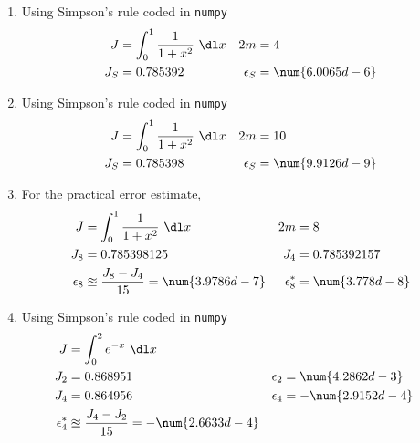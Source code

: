 \begin{enumerate}
    \item Using Simpson's rule coded in \texttt{numpy}
          \begin{align}
              J          & = \int_{0}^{1} \frac{1}{1 + x^2}\ \dl x &
              2m         & = 4                                       \\
              J_S        & = 0.785392                              &
              \epsilon_S & = \num{6.0065d-6}
          \end{align}

    \item Using Simpson's rule coded in \texttt{numpy}
          \begin{align}
              J          & = \int_{0}^{1} \frac{1}{1 + x^2}\ \dl x &
              2m         & = 10                                      \\
              J_S        & = 0.785398                              &
              \epsilon_S & = \num{9.9126d-9}
          \end{align}

    \item For the practical error estimate,
          \begin{align}
              J            & = \int_{0}^{1} \frac{1}{1 + x^2}\ \dl x          &
              2m           & = 8                                                \\
              J_8          & = 0.785398125                                    &
              J_4          & = 0.785392157                                      \\
              \epsilon_8   & \approxeq \frac{J_8 - J_4}{15} = \num{3.9786d-7} &
              \epsilon^*_8 & = \num{3.778d-8}
          \end{align}

    \item Using Simpson's rule coded in \texttt{numpy}
          \begin{align}
              J            & = \int_{0}^{2} e^{-x}\ \dl x                        \\
              J_2          & = 0.868951                                        &
              \epsilon_2   & = \num{4.2862d-3}                                   \\
              J_4          & = 0.864956                                        &
              \epsilon_4   & = -\num{2.9152d-4}                                  \\
              \epsilon^*_4 & \approxeq \frac{J_4 - J_2}{15} = -\num{2.6633d-4}
          \end{align}


\end{enumerate}
